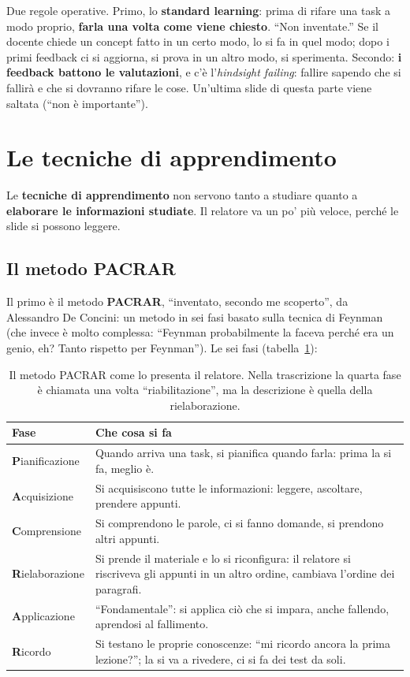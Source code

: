 Due regole operative. Primo, lo \textbf{standard learning}: prima di rifare
una task a modo proprio, \textbf{farla una volta come viene chiesto}. ``Non
inventate.'' Se il docente chiede un concept fatto in un certo modo, lo si
fa in quel modo; dopo i primi feedback ci si aggiorna, si prova in un altro
modo, si sperimenta. Secondo: \textbf{i feedback battono le valutazioni}, e
c'è l'\emph{hindsight failing}: fallire sapendo che si fallirà e che si
dovranno rifare le cose. Un'ultima slide di questa parte viene saltata
(``non è importante'').

\section{Le tecniche di apprendimento}
\label{p0:sec:tecniche}

Le \textbf{tecniche di apprendimento} non servono tanto a studiare quanto a
\textbf{elaborare le informazioni studiate}. Il relatore va un po' più
veloce, perché le slide si possono leggere.

\subsection{Il metodo PACRAR}

Il primo è il metodo \textbf{PACRAR}, ``inventato, secondo me scoperto'', da
Alessandro De Concini: un metodo in sei fasi basato sulla tecnica di
Feynman (che invece è molto complessa: ``Feynman probabilmente la faceva
perché era un genio, eh? Tanto rispetto per Feynman''). Le sei fasi
(tabella~\ref{p0:tab:pacrar}):

\begin{table}[htbp]
\centering
\small
\begin{tabular}{@{}lp{9.5cm}@{}}
\toprule
\textbf{Fase} & \textbf{Che cosa si fa} \\
\midrule
\textbf{P}ianificazione & Quando arriva una task, si pianifica quando
farla: prima la si fa, meglio è. \\
\textbf{A}cquisizione & Si acquisiscono tutte le informazioni: leggere,
ascoltare, prendere appunti. \\
\textbf{C}omprensione & Si comprendono le parole, ci si fanno domande, si
prendono altri appunti. \\
\textbf{R}ielaborazione & Si prende il materiale e lo si riconfigura: il
relatore si riscriveva gli appunti in un altro ordine, cambiava l'ordine dei
paragrafi. \\
\textbf{A}pplicazione & ``Fondamentale'': si applica ciò che si impara,
anche fallendo, aprendosi al fallimento. \\
\textbf{R}icordo & Si testano le proprie conoscenze: ``mi ricordo ancora la
prima lezione?''; la si va a rivedere, ci si fa dei test da soli. \\
\bottomrule
\end{tabular}
\caption{Il metodo PACRAR come lo presenta il relatore. Nella trascrizione
la quarta fase è chiamata una volta ``riabilitazione'', ma la descrizione è
quella della rielaborazione.}
\label{p0:tab:pacrar}
\end{table}

